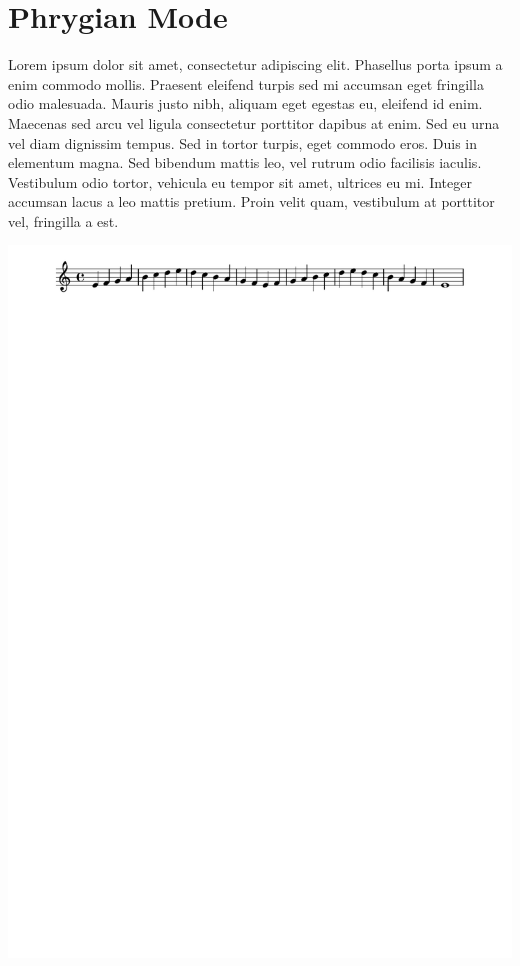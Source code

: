 \documentclass[11pt]{article}
\begin{document}
\section*{Phrygian Mode}
\label{sec:orgd287fbd}

Lorem ipsum dolor sit amet, consectetur adipiscing elit. Phasellus
porta ipsum a enim commodo mollis. Praesent eleifend turpis sed mi
accumsan eget fringilla odio malesuada. Mauris justo nibh, aliquam
eget egestas eu, eleifend id enim. Maecenas sed arcu vel ligula
consectetur porttitor dapibus at enim. Sed eu urna vel diam dignissim
tempus. Sed in tortor turpis, eget commodo eros. Duis in elementum
magna. Sed bibendum mattis leo, vel rutrum odio facilisis iaculis.
Vestibulum odio tortor, vehicula eu tempor sit amet, ultrices eu mi.
Integer accumsan lacus a leo mattis pretium. Proin velit quam,
vestibulum at porttitor vel, fringilla a est.

\begin{center}
\includegraphics[width=.9\linewidth]{phrygian.pdf}
\end{center}
\end{document}

